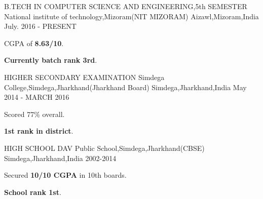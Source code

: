 \begin{cventries}
  \cventry
    {B.TECH IN COMPUTER SCIENCE AND ENGINEERING,5th SEMESTER}
    {National institute of technology,Mizoram(NIT MIZORAM)}
    {Aizawl,Mizoram,India}
    {July. 2016 - PRESENT}
    {
      \begin{cvitems}
        \item {CGPA of \textbf{8.63/10}.}
        \item {\textbf{Currently batch rank 3rd}.}
      \end{cvitems}
    }
    \cventry
    {HIGHER SECONDARY EXAMINATION}
    {Simdega College,Simdega,Jharkhand(Jharkhand Board)}
    {Simdega,Jharkhand,India}
    {May 2014 - MARCH 2016}
    {
      \begin{cvitems}
        \item {Scored 77\% overall.}
        \item {\textbf{1st rank in district}.}
      \end{cvitems}
    }
    \cventry
    {HIGH SCHOOL}
    {DAV Public School,Simdega,Jharkhand(CBSE)}
    {Simdega,Jharkhand,India}
    {2002-2014}
    {
      \begin{cvitems}
        \item {Secured \textbf{10/10 CGPA} in 10th boards.}
        \item {\textbf{School rank 1st}.}
      \end{cvitems}
    }
\end{cventries}
